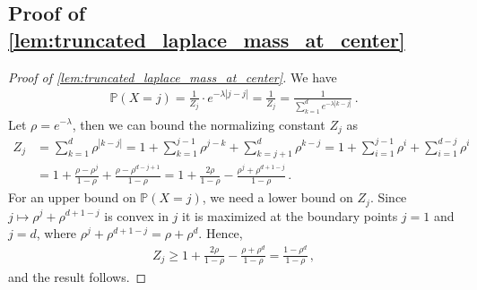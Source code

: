 \documentclass{article}
\theoremstyle{plain}
\theoremstyle{definition}
\theoremstyle{plain}
\begin{document}
\subsection{Proof of \texorpdfstring{\cref{lem:truncated_laplace_mass_at_center}}{Lemma (Truncated Laplace mass at center)}}
\label{proof:lem:truncated_laplace_mass_at_center}
\begin{proof}[Proof of \cref{lem:truncated_laplace_mass_at_center}]
    We have
    \begin{align}
        \mathbb{P}(X=j) = \frac{1}{Z_j} \cdot e^{-\lambda |j-j|} = \frac{1}{Z_j} = \frac{1}{\sum_{k=1}^d e^{-\lambda |k-j|}}\,.
    \end{align}
    Let $\rho = e^{-\lambda}$, then we can bound the normalizing constant $Z_j$ as
    \begin{align}
        Z_j & = \sum_{k=1}^d \rho^{|k-j|}
        = 1 + \sum_{k=1}^{j-1} \rho^{j-k} + \sum_{k=j+1}^d \rho^{k-j}
        = 1 + \sum_{i=1}^{j-1} \rho^i + \sum_{i=1}^{d-j} \rho^i                       \\
            & = 1 + \frac{\rho - \rho^j}{1-\rho} + \frac{\rho - \rho^{d-j+1}}{1-\rho}
        = 1 + \frac{2 \rho}{1-\rho} - \frac{\rho^j + \rho^{d+1-j}}{1-\rho}\,.
    \end{align}
    For an upper bound on $\mathbb{P}(X=j)$, we need a lower bound on $Z_j$.
    Since $j\mapsto \rho^j + \rho^{d+1-j}$ is convex in $j$ it is maximized at the boundary points $j=1$ and $j=d$, where $\rho^j + \rho^{d+1-j} = \rho + \rho^d$.
    Hence,
    \begin{align}
        Z_j \ge 1 + \frac{2 \rho}{1-\rho} - \frac{\rho + \rho^d}{1-\rho}
        = \frac{1-\rho^d}{1 - \rho}\,,
    \end{align}
    and the result follows.
\end{proof}
\end{document}
